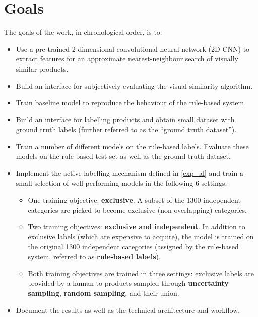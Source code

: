 \section{Goals}

The goals of the work, in chronological order, is to:

\begin{itemize}
  \item Use a pre-trained 2-dimensional convolutional neural network (2D CNN) to extract features for an approximate nearest-neighbour search of visually similar products.
  \item Build an interface for subjectively evaluating the visual similarity algorithm.
  \item Train  baseline model to reproduce the behaviour of the rule-based system.
  \item Build an interface for labelling products and obtain small dataset with ground truth labels (further referred to as the ``ground truth dataset'').
  \item Train a number of different models on the rule-based labels.  Evaluate these models on the rule-based test set as well as the ground truth dataset.
  \item Implement the active labelling mechanism defined in \ref{exp_al} and train a small selection of well-performing models in the following 6 settings:
    \begin{itemize}
      \item One training objective: \textbf{exclusive}. A subset of the 1300 independent categories are picked to become exclusive (non-overlapping) categories.
      \item Two training objectives: \textbf{exclusive and independent}. In addition to exclusive labels (which are expensive to acquire), the model is trained on the original 1300 independent categories (assigned by the rule-based system, referred to as \textbf{rule-based labels}).
      \item Both training objectives are trained in three settings: exclusive labels are provided by a human to products sampled through \textbf{uncertainty sampling}, \textbf{random sampling}, and their union.
    \end{itemize}
  \item Document the results as well as the technical architecture and workflow.
\end{itemize}

